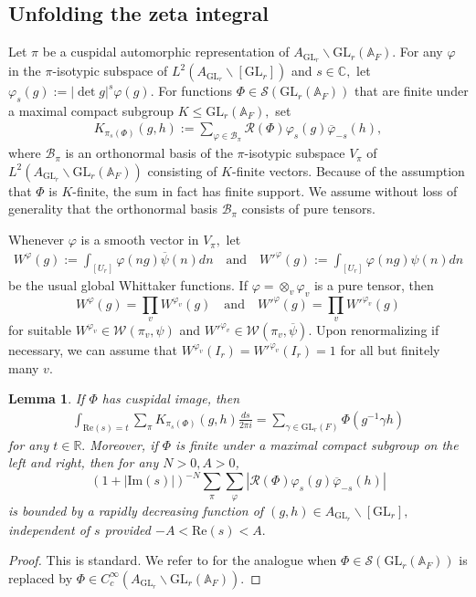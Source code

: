 \documentclass[12pt]{amsart}
\newtheorem{lem}[thm]{Lemma}
\theoremstyle{remark}
\numberwithin{equation}{section}
\newcommand{\A}{\mathbb{A}}
\newcommand{\GL}{\mathrm{GL}}
\newcommand{\CC}{\mathbb{C}}
\newcommand{\RR}{\mathbb{R}}
\theoremstyle{definition}
\numberwithin{equation}{subsection}
\begin{document}
\subsection{Unfolding the zeta integral}

Let $\pi$ be a cuspidal automorphic representation of $A_{\GL_r} \backslash \GL_r(\A_F).$ For any $\varphi$ in the $\pi$-isotypic subspace of $L^2(A_{\GL_r} \backslash [\GL_r])$ and $s \in \CC,$ let $\varphi_{s}(g):=|\det g|^{s}\varphi(g).$  For functions $\Phi \in \mathcal{S}(\GL_r(\A_F))$ that are finite under a maximal compact subgroup $K\leq \GL_r(\A_F),$ set
\begin{align*}
    K_{\pi_s(\Phi)}(g,h):=\sum_{\varphi \in \mathcal{B}_{\pi}}\mathcal{R}(\Phi)\varphi_s(g)\overline{\varphi}_{-s}(h),
\end{align*}
where $\mathcal{B}_{\pi}$ is an orthonormal basis of the $\pi$-isotypic subspace $V_\pi$ of $L^2(A_{\GL_r} \backslash \GL_r(\A_F))$ consisting of $K$-finite vectors.  
Because of the assumption that $\Phi$ is $K$-finite, the sum in fact has finite support.   
We assume without loss of generality that the orthonormal basis $\mathcal{B}_{\pi}$ consists of pure tensors.  

Whenever $\varphi$ is a smooth vector in $V_\pi,$ let
\begin{align} \label{global:Whitt}
    W^{\varphi}(g):=\int_{[U_r]}\varphi(ng)\overline{\psi}(n)dn \quad\textrm{and} \quad W'^{\varphi}(g):=\int_{[U_r]}\varphi(ng)\psi(n)dn
\end{align}
be the usual global Whittaker functions.  If $\varphi=\otimes_v\varphi_v$ is a pure tensor, then 
$$
W^{\varphi}(g)=\prod_vW^{\varphi_v}(g) \quad\textrm{and}\quad W'^{\varphi}(g)=\prod_vW'^{\varphi_v}(g)
$$
for suitable $W^{\varphi_v}\in \mathcal{W}(\pi_v,\psi)$ and $W'^{\varphi_v} \in \mathcal{W}(\pi_v,\overline{\psi}).$  Upon renormalizing if necessary, we can  assume that $W^{\varphi_v}(I_r)=W'^{\varphi_v}(I_r)=1$ for all but finitely many $v.$   

\begin{lem} \label{lem:rap:dec}
 If $\Phi$ has cuspidal image, then
\begin{align*}
    \int_{\mathrm{Re}(s)=t}\sum_{\pi}K_{\pi_s(\Phi)}(g,h)\frac{ds}{2\pi i}=\sum_{\gamma \in \GL_{r}(F)}\Phi(g^{-1}\gamma h)
\end{align*}
for any $t\in \RR.$  Moreover, if $\Phi$ is finite under a maximal compact subgroup on the left and right, then for any $N>0,A>0$,
$$
(1+|\mathrm{Im}(s)|)^{-N}\sum_{\pi}\sum_{\varphi}|\mathcal{R}(\Phi)\varphi_s(g)\overline{\varphi}_{-s}(h)|
$$
is bounded by a rapidly decreasing function of $(g,h) \in A_{\GL_r} \backslash [\GL_{r}],$ independent of $s $ provided $-A<\mathrm{Re}(s)<A.$
\end{lem}
\begin{proof}
This is standard.  We refer to \cite[Chapter 16]{Getz:Hahn} for the analogue when $\Phi \in \mathcal{S}(\GL_r(\A_F))$ is replaced by $\Phi \in C^\infty_c(A_{\GL_r} \backslash \GL_r(\A_F)).$
\end{proof}
\end{document}
